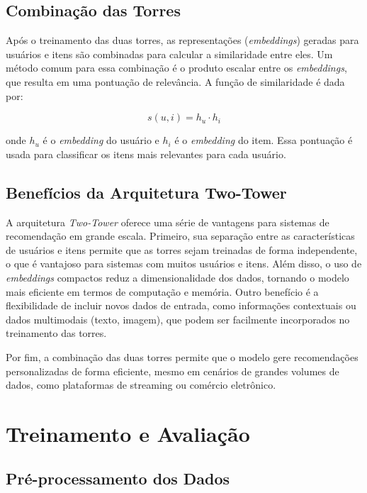 \documentclass[sigconf]{acmart}
\begin{document}
\subsection{Combinação das Torres}

Após o treinamento das duas torres, as representações (\textit{embeddings}) geradas para usuários e itens são combinadas para calcular a similaridade entre eles. Um método comum para essa combinação é o produto escalar entre os \textit{embeddings}, que resulta em uma pontuação de relevância. A função de similaridade é dada por:

\begin{equation}
    s(u, i) = h_{u} \cdot h_{i}
\end{equation}

onde $h_{u}$ é o \textit{embedding} do usuário e $h_{i}$ é o \textit{embedding} do item. Essa pontuação é usada para classificar os itens mais relevantes para cada usuário.

\subsection{Benefícios da Arquitetura Two-Tower}

A arquitetura \textit{Two-Tower} oferece uma série de vantagens para sistemas de recomendação em grande escala. Primeiro, sua separação entre as características de usuários e itens permite que as torres sejam treinadas de forma independente, o que é vantajoso para sistemas com muitos usuários e itens. Além disso, o uso de \textit{embeddings} compactos reduz a dimensionalidade dos dados, tornando o modelo mais eficiente em termos de computação e memória. Outro benefício é a flexibilidade de incluir novos dados de entrada, como informações contextuais ou dados multimodais (texto, imagem), que podem ser facilmente incorporados no treinamento das torres.

Por fim, a combinação das duas torres permite que o modelo gere recomendações personalizadas de forma eficiente, mesmo em cenários de grandes volumes de dados, como plataformas de streaming ou comércio eletrônico.

\section{Treinamento e Avaliação}

\subsection{Pré-processamento dos Dados}
\end{document}
